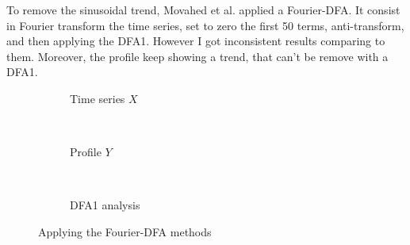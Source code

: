 To remove the sinusoidal trend, Movahed et al. applied a Fourier-DFA. It consist in Fourier transform the time series, set to zero the first 50 terms, anti-transform, and then applying the DFA1. However I got inconsistent results comparing to them. Moreover, the profile keep showing a trend, that can't be remove with a DFA1.

\begin{figure}[!h]
	\centering
	\begin{subfigure}{0.48\textwidth}
		
		\caption{Time series $X$}
	\end{subfigure}
	~
	\begin{subfigure}{0.48\textwidth}
		
		\caption{Profile $Y$}
	\end{subfigure}
	~
	\begin{subfigure}{0.48\textwidth}
		
		\caption{DFA1 analysis}
	\end{subfigure}
	\caption{Applying the Fourier-DFA methods}
\end{figure}
